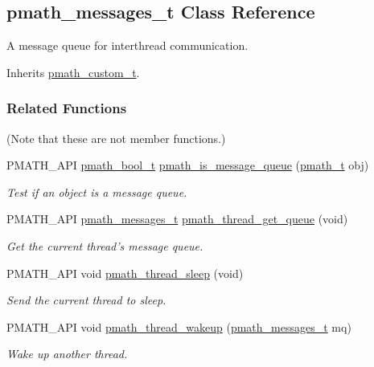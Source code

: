 \hypertarget{classpmath__messages__t}{
\subsection{pmath\_\-messages\_\-t Class Reference}
\label{classpmath__messages__t}
}
A message queue for interthread communication.  


Inherits \hyperlink{classpmath__custom__t}{pmath\_\-custom\_\-t}.

\subsubsection*{Related Functions}
(Note that these are not member functions.) \begin{CompactItemize}
\item 
PMATH\_\-API \hyperlink{group__general__types_gc92090cb0b56345d6c379ed2341d4ef4}{pmath\_\-bool\_\-t} \hyperlink{group__threadmsg_g93b45ad8c3063c94602c8bbaaf3c2613}{pmath\_\-is\_\-message\_\-queue} (\hyperlink{classpmath__t}{pmath\_\-t} obj)
\begin{CompactList}\small\item\em Test if an object is a message queue. \item\end{CompactList}\item 
PMATH\_\-API \hyperlink{classpmath__messages__t}{pmath\_\-messages\_\-t} \hyperlink{group__threadmsg_gf4d69db0ffe06846e57df7cadcd3dab6}{pmath\_\-thread\_\-get\_\-queue} (void)
\begin{CompactList}\small\item\em Get the current thread's message queue. \item\end{CompactList}\item 
PMATH\_\-API void \hyperlink{group__threadmsg_gce6da6e34b0aeab35094ddccdd9a3e55}{pmath\_\-thread\_\-sleep} (void)
\begin{CompactList}\small\item\em Send the current thread to sleep. \item\end{CompactList}\item 
PMATH\_\-API void \hyperlink{group__threadmsg_gbf90d49f5c42ccaa736ae5e56af6a4a6}{pmath\_\-thread\_\-wakeup} (\hyperlink{classpmath__messages__t}{pmath\_\-messages\_\-t} mq)
\begin{CompactList}\small\item\em Wake up another thread. \item\end{CompactList}\item 

\end{CompactItemize}
